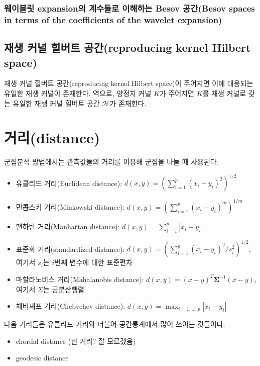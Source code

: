 \documentclass[b5paper,]{scrbook}
\theoremstyle{plain}
\theoremstyle{definition}
\numberwithin{equation}{section}
\begin{document}
\subsubsection{웨이블릿 expansion의 계수들로 이해하는 Besov 공간(Besov
spaces in terms of the coefficients of the wavelet
expansion)}\label{-expansion---besov-besov-spaces-in-terms-of-the-coefficients-of-the-wavelet-expansion}

\subsection{재생 커널 힐버트 공간(reproducing kernel Hilbert
space)}\label{---reproducing-kernel-hilbert-space}

재생 커널 힐버트 공간(reproducing kernel Hilbert space)이 주어지면 이에
대응되는 유일한 재생 커널이 존재한다. 역으로, 양정치 커널 \(K\)가
주어지면 \(K\)를 재생 커널로 갖는 유일한 재생 커널 힐버트 공간
\(\mathcal{H}\)가 존재한다.

\section{거리(distance)}\label{distance}

군집분석 방법에서는 관측값들의 거리를 이용해 군집을 나눌 때 사용된다.

\begin{itemize}
\item
  유클리드 거리(Euclidean distance):
  \(d(x,y)=(\sum_{i=1}^{p}(x_{i}-y_{i})^{2})^{1/2}\)
\item
  민콥스키 거리(Minkowski distance):
  \(d(x,y)=(\sum_{i=1}^{p}(x_{i}-y_{i})^{m})^{1/m}\)
\item
  맨하탄 거리(Manhattan distance):
  \(d(x,y)=\sum_{i=1}^{p}|x_{i}-y_{i}|\)
\item
  표준화 거리(standardized distance):
  \(d(x,y)=(\sum_{i=1}^{p}(x_{i}-y_{i})^{2}/s_{i}^{2})^{1/2}\), 여기서
  \(s_{i}\)는 \(i\)번째 변수에 대한 표준편차
\item
  마할라노비스 거리(Mahalanobis distance):
  \(d(x,y)=(x-y)^{T}\boldsymbol{\Sigma}^{-1}(x-y)\), 여기서 \(\Sigma\)는
  공분산행렬
\item
  체비셰프 거리(Chebychev distance):
  \(d(x,y)=\max_{i=1,\ldots ,p}|x_{i}-y_{i}|\)
\end{itemize}

다음 거리들은 유클리드 거리와 더불어 공간통계에서 많이 쓰이는 것들이다.

\begin{itemize}
\item
  chordal distance (현 거리? 잘 모르겠음)
\item
  geodesic distance
\end{itemize}
\end{document}
